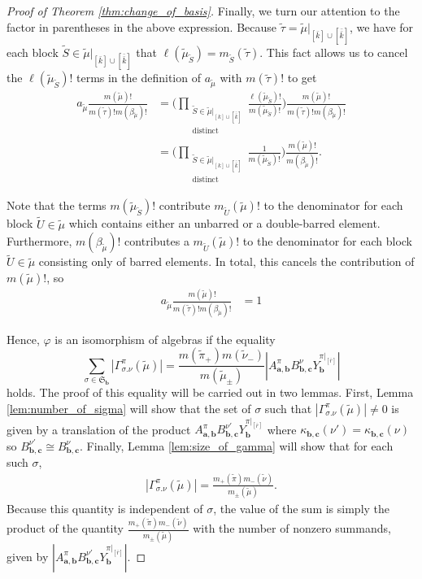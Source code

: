\documentclass[10pt]{amsart}
\theoremstyle{definition}
\theoremstyle{definition}
\theoremstyle{plain}
\theoremstyle{remark}
\theoremstyle{plain}
\theoremstyle{plain}
\newcommand{\SG}{\mathfrak{S}}
\newcommand{\bfa}{{\boldsymbol{a}}}
\newcommand{\bfb}{{\boldsymbol{b}}}
\newcommand{\bfc}{{\boldsymbol{c}}}
\newcommand{\ttau}{{\tilde{\tau}}}
\newcommand{\tpi}{{\tilde{\pi}}}
\newcommand{\tmu}{{\tilde{\mu}}}
\newcommand{\tnu}{{\tilde{\nu}}}
\newcommand{\tS}{{\tilde{S}}}
\newcommand{\tU}{{\tilde{U}}}
\newcommand{\ov}[1]{\bar{#1}}
\newcommand{\ovb}[1]{\left[\ov{#1}\right]}
\newcommand{\ovov}[1]{\bar{\bar{#1}}}
\newcommand{\ovovb}[1]{\left[\ovov{#1}\right]}
\newcommand{\abs}[1]{\left| #1\right |}
\begin{document}
\begin{proof}[Proof of Theorem \ref{thm:change_of_basis}]
    Finally, we turn our attention to the factor in parentheses in the above expression. Because $\ttau=\tmu|_{\ovb{k}\cup\ovovb{k}}$, we have for each block $\tS\in\tmu|_{\ovb{k}\cup\ovovb{k}}$ that $\ell(\tmu_{\tS})=m_{\tS}(\ttau)$. This fact allows us to cancel the $\ell(\tmu_\tS)!$ terms in the definition of $a_\tmu$ with $m(\ttau)!$ to get
    \begin{align*}
        a_\tmu\frac{m(\tmu)!}{m(\ttau)!m(\beta_\tmu)!}&=\Bigg(\prod_{\substack{\tS\in\tmu|_{[k]\cup\ovovb{k}}\\\text{distinct}}}\frac{\ell(\tmu_\tS)!}{m(\tmu_\tS)!}\Bigg)\frac{m(\tmu)!}{m(\ttau)!m(\beta_\tmu)!}\\
        &=\Bigg(\prod_{\substack{\tS\in\tmu|_{[k]\cup\ovovb{k}}\\\text{distinct}}}\frac{1}{m(\tmu_\tS)!}\Bigg)\frac{m(\tmu)!}{m(\beta_\tmu)!}.
    \end{align*} 

    Note that the terms $m(\tmu_\tS)!$ contribute $m_\tU(\tmu)!$ to the denominator for each block $\tU\in\tmu$ which contains either an unbarred or a double-barred element. Furthermore, $m(\beta_\tmu)!$ contributes a $m_\tU(\tmu)!$ to the denominator for each block $\tU\in\tmu$ consisting only of barred elements. In total, this cancels the contribution of $m(\tmu)!$, so \begin{align*}
        a_\tmu\frac{m(\tmu)!}{m(\ttau)!m(\beta_\tmu)!}&=1
    \end{align*}

    Hence, $\varphi$ is an isomorphism of algebras if the equality \[\sum_{\sigma\in\SG_\bfb}\abs{\Gamma^\pi_{\sigma.\nu}(\tmu)}=\frac{m(\tpi_+)m(\tnu_-)}{m(\tmu_\pm)}{\abs{A_{\bfa,\bfb}^\pi B_{\bfb,\bfc}^\nu Y_{\bfb}^{\pi|_{\ovb{r}}}}}\] holds. The proof of this equality will be carried out in two lemmas. First, Lemma \ref{lem:number_of_sigma} will show that the set of $\sigma$ such that $\abs{\Gamma_{\sigma.\nu}^\pi(\tmu)}\neq0$ is given by a translation of the product $A_{\bfa,\bfb}^\pi B_{\bfb,\bfc}^{\nu'} Y_\bfb^{\pi|_{\ovb{r}}}$ where $\kappa_{\bfb,\bfc}(\nu')=\kappa_{\bfb,\bfc}(\nu)$ so $B_{\bfb,\bfc}^{\nu'}\cong B_{\bfb,\bfc}^{\nu}$. Finally, Lemma \ref{lem:size_of_gamma} will show that for each such $\sigma$, \begin{align*}
        \abs{\Gamma_{\sigma.\nu}^\pi(\tmu)}=\frac{m_+(\tpi)m_-(\tnu)}{m_\pm(\tmu)}.
    \end{align*} Because this quantity is independent of $\sigma$, the value of the sum is simply the product of the quantity $\frac{m_+(\tpi)m_-(\tnu)}{m_\pm(\tmu)}$ with the number of nonzero summands, given by $\abs{A_{\bfa,\bfb}^\pi B_{\bfb,\bfc}^{\nu'} Y_\bfb^{\pi|_{\ovb{r}}}}$.
\end{proof}
\end{document}
